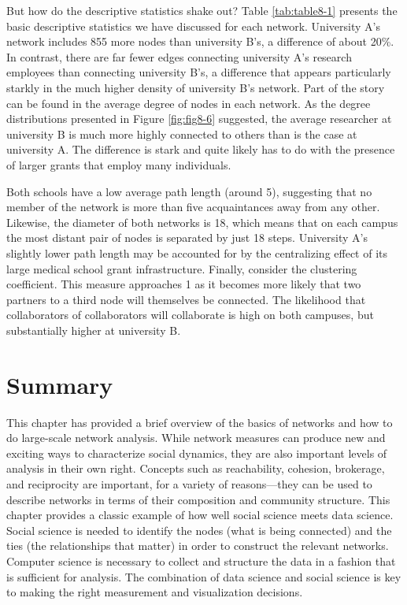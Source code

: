 \documentclass[]{krantz}
\begin{document}
But how do the descriptive statistics shake out? Table
\ref{tab:table8-1} presents the basic descriptive statistics we have
discussed for each network. University A's network includes 855 more
nodes than university B's, a difference of about 20\%. In contrast,
there are far fewer edges connecting university A's research employees
than connecting university B's, a difference that appears particularly
starkly in the much higher density of university B's network. Part of
the story can be found in the average degree of nodes in each network.
As the degree distributions presented in Figure \ref{fig:fig8-6}
suggested, the average researcher at university B is much more highly
connected to others than is the case at university A. The difference is
stark and quite likely has to do with the presence of larger grants that
employ many individuals.

Both schools have a low average path length (around 5), suggesting that
no member of the network is more than five acquaintances away from any
other. Likewise, the diameter of both networks is 18, which means that
on each campus the most distant pair of nodes is separated by just 18
steps. University A's slightly lower path length may be accounted for by
the centralizing effect of its large medical school grant
infrastructure. Finally, consider the clustering coefficient. This
measure approaches 1 as it becomes more likely that two partners to a
third node will themselves be connected. The likelihood that
collaborators of collaborators will collaborate is high on both
campuses, but substantially higher at university B.

\section{Summary}\label{summary-5}

This chapter has provided a brief overview of the basics of networks and
how to do large-scale network analysis. While network measures can
produce new and exciting ways to characterize social dynamics, they are
also important levels of analysis in their own right. Concepts such as
reachability, cohesion, brokerage, and reciprocity are important, for a
variety of reasons---they can be used to describe networks in terms of
their composition and community structure. This chapter provides a
classic example of how well social science meets data science. Social
science is needed to identify the nodes (what is being connected) and
the ties (the relationships that matter) in order to construct the
relevant networks. Computer science is necessary to collect and
structure the data in a fashion that is sufficient for analysis. The
combination of data science and social science is key to making the
right measurement and visualization decisions.
\end{document}
